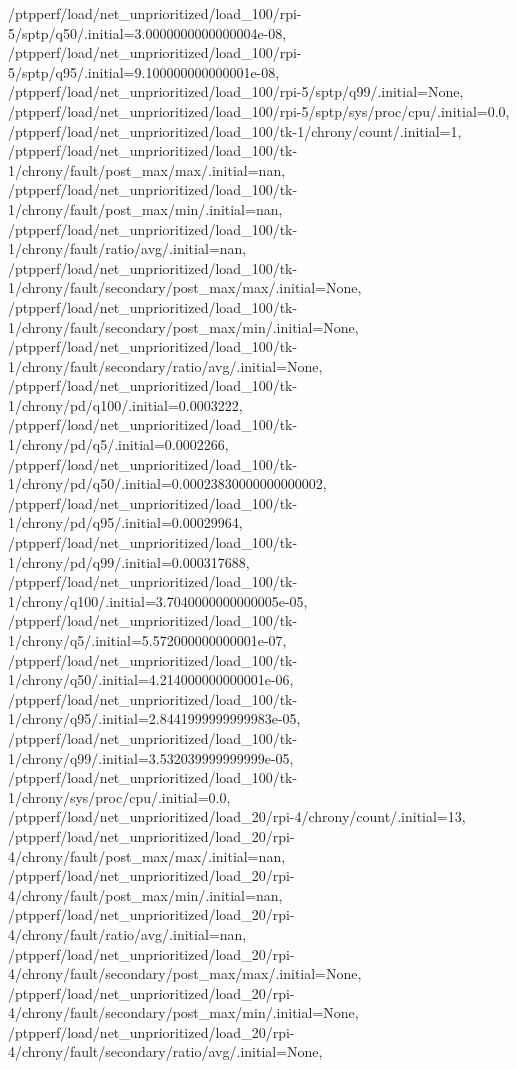 {    /ptpperf/load/net_unprioritized/load_100/rpi-5/sptp/q50/.initial=3.0000000000000004e-08,
    /ptpperf/load/net_unprioritized/load_100/rpi-5/sptp/q95/.initial=9.100000000000001e-08,
    /ptpperf/load/net_unprioritized/load_100/rpi-5/sptp/q99/.initial=None,
    /ptpperf/load/net_unprioritized/load_100/rpi-5/sptp/sys/proc/cpu/.initial=0.0,
    /ptpperf/load/net_unprioritized/load_100/tk-1/chrony/count/.initial=1,
    /ptpperf/load/net_unprioritized/load_100/tk-1/chrony/fault/post_max/max/.initial=nan,
    /ptpperf/load/net_unprioritized/load_100/tk-1/chrony/fault/post_max/min/.initial=nan,
    /ptpperf/load/net_unprioritized/load_100/tk-1/chrony/fault/ratio/avg/.initial=nan,
    /ptpperf/load/net_unprioritized/load_100/tk-1/chrony/fault/secondary/post_max/max/.initial=None,
    /ptpperf/load/net_unprioritized/load_100/tk-1/chrony/fault/secondary/post_max/min/.initial=None,
    /ptpperf/load/net_unprioritized/load_100/tk-1/chrony/fault/secondary/ratio/avg/.initial=None,
    /ptpperf/load/net_unprioritized/load_100/tk-1/chrony/pd/q100/.initial=0.0003222,
    /ptpperf/load/net_unprioritized/load_100/tk-1/chrony/pd/q5/.initial=0.0002266,
    /ptpperf/load/net_unprioritized/load_100/tk-1/chrony/pd/q50/.initial=0.00023830000000000002,
    /ptpperf/load/net_unprioritized/load_100/tk-1/chrony/pd/q95/.initial=0.00029964,
    /ptpperf/load/net_unprioritized/load_100/tk-1/chrony/pd/q99/.initial=0.000317688,
    /ptpperf/load/net_unprioritized/load_100/tk-1/chrony/q100/.initial=3.7040000000000005e-05,
    /ptpperf/load/net_unprioritized/load_100/tk-1/chrony/q5/.initial=5.572000000000001e-07,
    /ptpperf/load/net_unprioritized/load_100/tk-1/chrony/q50/.initial=4.214000000000001e-06,
    /ptpperf/load/net_unprioritized/load_100/tk-1/chrony/q95/.initial=2.8441999999999983e-05,
    /ptpperf/load/net_unprioritized/load_100/tk-1/chrony/q99/.initial=3.532039999999999e-05,
    /ptpperf/load/net_unprioritized/load_100/tk-1/chrony/sys/proc/cpu/.initial=0.0,
    /ptpperf/load/net_unprioritized/load_20/rpi-4/chrony/count/.initial=13,
    /ptpperf/load/net_unprioritized/load_20/rpi-4/chrony/fault/post_max/max/.initial=nan,
    /ptpperf/load/net_unprioritized/load_20/rpi-4/chrony/fault/post_max/min/.initial=nan,
    /ptpperf/load/net_unprioritized/load_20/rpi-4/chrony/fault/ratio/avg/.initial=nan,
    /ptpperf/load/net_unprioritized/load_20/rpi-4/chrony/fault/secondary/post_max/max/.initial=None,
    /ptpperf/load/net_unprioritized/load_20/rpi-4/chrony/fault/secondary/post_max/min/.initial=None,
    /ptpperf/load/net_unprioritized/load_20/rpi-4/chrony/fault/secondary/ratio/avg/.initial=None,
}
